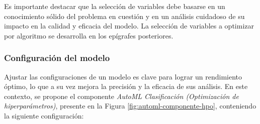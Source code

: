 Es importante destacar que la selección de variables debe basarse en un conocimiento sólido del problema en cuestión y en un análisis cuidadoso de su impacto en la calidad y eficacia del modelo. La selección de variables a optimizar por algoritmo se desarrolla en los epígrafes posteriores. 

\subsubsection*{Configuración del modelo}

Ajustar las configuraciones de un modelo es clave para lograr un rendimiento óptimo, lo que a su vez mejora la precisión y la eficacia de sus análisis. En este contexto, se propone el componente \textit{AutoML Clasificación (Optimización de hiperparámetros)}, presente en la Figura \ref{fig:automl-componente-hpo}, conteniendo la siguiente configuración:

